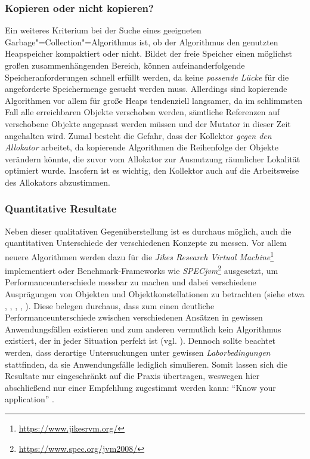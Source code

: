 \subsubsection*{Kopieren oder nicht kopieren?}
Ein weiteres Kriterium bei der Suche eines geeigneten Garbage"=Collection"=Algorithmus ist, ob der Algorithmus den genutzten Heapspeicher kompaktiert oder nicht.
Bildet der freie Speicher einen möglichst großen zusammenhängenden Bereich, können aufeinanderfolgende Speicheranforderungen schnell erfüllt werden, da keine \textit{passende Lücke} für die angeforderte Speichermenge gesucht werden muss.
Allerdings sind kopierende Algorithmen vor allem für große Heaps tendenziell langsamer, da im schlimmsten Fall alle erreichbaren Objekte verschoben werden, sämtliche Referenzen auf verschobene Objekte angepasst werden müssen und der Mutator in dieser Zeit angehalten wird.
Zumal besteht die Gefahr, dass der Kollektor \textit{gegen den Allokator} arbeitet, da kopierende Algorithmen die Reihenfolge der Objekte verändern könnte, die zuvor vom Allokator zur Ausnutzung räumlicher Lokalität optimiert wurde.
Insofern ist es wichtig, den Kollektor auch auf die Arbeitsweise des Allokators abzustimmen.




\subsubsection*{Quantitative Resultate}
Neben dieser qualitativen Gegenüberstellung ist es durchaus möglich, auch die quantitativen Unterschiede der verschiedenen Konzepte zu messen.
Vor allem neuere Algorithmen werden dazu für die \textit{Jikes Research Virtual Machine}\footnote{\url{https://www.jikesrvm.org/}} implementiert oder Benchmark-Frameworks wie \textit{SPECjvm}\footnote{\url{https://www.spec.org/jvm2008/}} ausgesetzt, um Performanceunterschiede messbar zu machen und dabei verschiedene Ausprägungen von Objekten und Objektkonstellationen zu betrachten (siehe etwa \cite{blackburn2003}, \cite{blackburn2004}, \cite{kermany2006}, \cite{levanoni2006}, \cite{garner2007}).
Diese belegen durchaus, dass zum einen deutliche Performanceunterschiede zwischen verschiedenen Ansätzen in gewissen Anwendungsfällen existieren und zum anderen vermutlich kein Algorithmus existiert, der in jeder Situation perfekt ist (vgl. \cite{fitzgerald2000}).
Dennoch sollte beachtet werden, dass derartige Untersuchungen unter gewissen \textit{Laborbedingungen} stattfinden, da sie Anwendungsfälle lediglich simulieren.
Somit lassen sich die Resultate nur eingeschränkt auf die Praxis übertragen, weswegen hier abschließend nur einer Empfehlung zugestimmt werden kann: \enquote{Know your application} \cite[S. 80]{handbook}.
